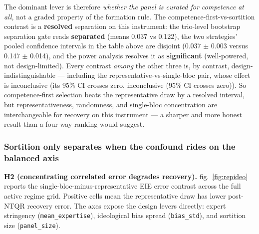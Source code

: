 \documentclass[
]{article}
\begin{document}
The dominant lever is therefore \emph{whether the panel is curated for
competence at all}, not a graded property of the formation rule. The
competence-first-vs-sortition contrast is a \textbf{resolved} separation
on this instrument: the trio-level bootstrap separation gate reads
\textbf{separated} (means 0.037 vs 0.122), the two strategies' pooled
confidence intervals in the table above are disjoint (0.037 \texorpdfstring{\ensuremath{\pm}}{+/-} 0.003
versus 0.147 \texorpdfstring{\ensuremath{\pm}}{+/-} 0.014), and the power analysis resolves it as
\textbf{significant} (well-powered, not design-limited). Every contrast
\emph{among} the other three is, by contrast, design-indistinguishable
--- including the representative-vs-single-bloc pair, whose effect is
inconclusive (its 95\% CI crosses zero, inconclusive (95\% CI crosses
zero)). So competence-first selection beats the representative draw by a
resolved interval, but representativeness, randomness, and single-bloc
concentration are interchangeable for recovery on this instrument --- a
sharper and more honest result than a four-way ranking would suggest.

\subsubsection{Sortition only separates when the confound rides on the
balanced
axis}\label{sortition-only-separates-when-the-confound-rides-on-the-balanced-axis}

\textbf{H2 (concentrating correlated error degrades recovery).}
fig.~\ref{fig:repideo} reports the single-bloc-minus-representative EIE
error contrast across the full active regime grid. Positive cells mean
the representative draw has lower post-NTQR recovery error. The axes
expose the design levers directly: expert stringency
(\texttt{mean\_expertise}), ideological bias spread
(\texttt{bias\_std}), and sortition size (\texttt{panel\_size}).
\end{document}
